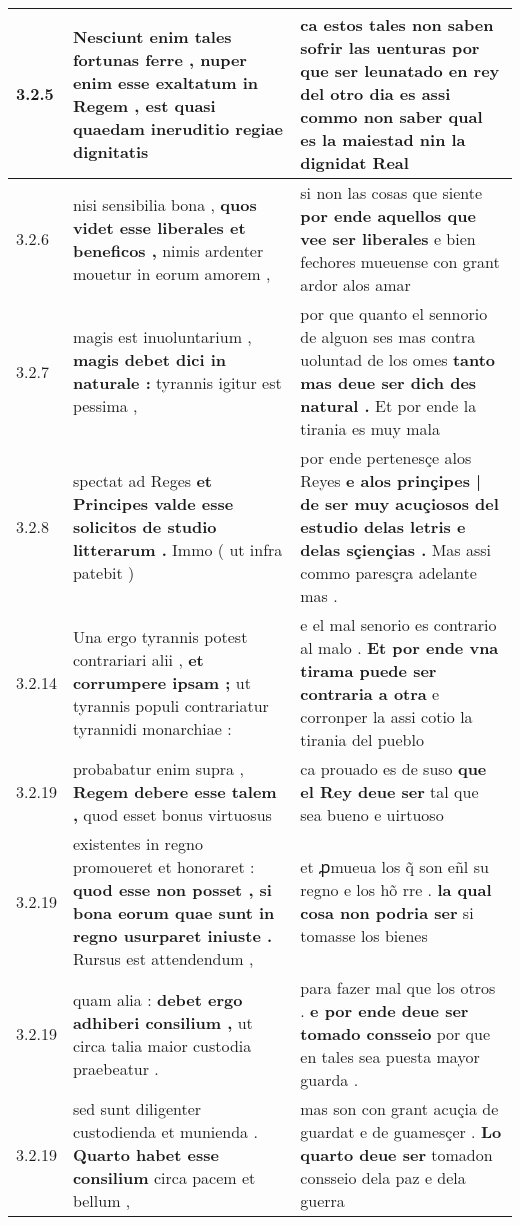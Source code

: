 \begin{tabular}{|p{1cm}|p{6.5cm}|p{6.5cm}|}
3.2.5 & Nesciunt enim tales fortunas ferre , \textbf{ nuper enim esse exaltatum in Regem , } est quasi quaedam ineruditio regiae dignitatis & ca estos tales non saben sofrir las uenturas \textbf{ por que ser leunatado en rey del otro dia es } assi commo non saber qual es la maiestad nin la dignidat Real \\\hline
3.2.6 & nisi sensibilia bona , \textbf{ quos videt esse liberales et beneficos , } nimis ardenter mouetur in eorum amorem , & si non las cosas que siente \textbf{ por ende aquellos que vee ser liberales } e bien fechores mueuense con grant ardor alos amar \\\hline
3.2.7 & magis est inuoluntarium , \textbf{ magis debet dici in naturale : } tyrannis igitur est pessima , & por que quanto el sennorio de alguon ses mas contra uoluntad de los omes \textbf{ tanto mas deue ser dich des natural . } Et por ende la tirania es muy mala \\\hline
3.2.8 & spectat ad Reges \textbf{ et Principes valde esse solicitos de studio litterarum . } Immo ( ut infra patebit ) & por ende pertenesçe alos Reyes \textbf{ e alos prinçipes | de ser muy acuçiosos del estudio delas letris e delas sçiençias . } Mas assi commo paresçra adelante mas . \\\hline
3.2.14 & Una ergo tyrannis potest contrariari alii , \textbf{ et corrumpere ipsam ; } ut tyrannis populi contrariatur tyrannidi monarchiae : & e el mal senorio es contrario al malo . \textbf{ Et por ende vna tirama puede ser contraria a otra } e corronper la assi cotio la tirania del pueblo \\\hline
3.2.19 & probabatur enim supra , \textbf{ Regem debere esse talem , } quod esset bonus virtuosus & ca prouado es de suso \textbf{ que el Rey deue ser } tal que sea bueno e uirtuoso \\\hline
3.2.19 & existentes in regno promoueret et honoraret : \textbf{ quod esse non posset , si bona eorum quae sunt in regno usurparet iniuste . } Rursus est attendendum , & et ꝓmueua los q̃ son eñl su regno e los hõ rre . \textbf{ la qual cosa non podria ser } si tomasse los bienes \\\hline
3.2.19 & quam alia : \textbf{ debet ergo adhiberi consilium , } ut circa talia maior custodia praebeatur . & para fazer mal que los otros . \textbf{ e por ende deue ser tomado consseio } por que en tales sea puesta mayor guarda . \\\hline
3.2.19 & sed sunt diligenter custodienda et munienda . \textbf{ Quarto habet esse consilium } circa pacem et bellum , & mas son con grant acuçia de guardat e de guamesçer . \textbf{ Lo quarto deue ser } tomadon consseio dela paz e dela guerra \\\hline

\end{tabular}

